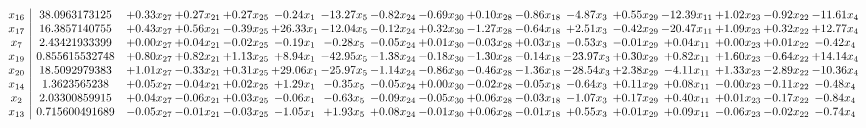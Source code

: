 \documentclass[9pt]{article}
\begin{document}
 \[\begin{array}{c| c c@{\hskip 2pt} c@{\hskip 2pt} c@{\hskip 2pt} c@{\hskip 2pt} c@{\hskip 2pt} c@{\hskip 2pt} c@{\hskip 2pt} c@{\hskip 2pt} c@{\hskip 2pt} c@{\hskip 2pt} c@{\hskip 2pt} c@{\hskip 2pt} c@{\hskip 2pt} c@{\hskip 2pt} c@{\hskip 2pt} }
 x_{16}   &  38.0963173125 & +  0.33 x_{27} & +  0.27 x_{21} & +  0.27 x_{25} & -0.24 x_{1} & -13.27 x_{5} & -0.82 x_{24} & -0.69 x_{30} & +  0.10 x_{28} & -0.86 x_{18} & -4.87 x_{3} & +  0.55 x_{29} & -12.39 x_{11} & +  1.02 x_{23} & -0.92 x_{22} & -11.61 x_{4}\\
 x_{17}   &  16.3857140755 & +  0.43 x_{27} & +  0.56 x_{21} & -0.39 x_{25} & + 26.33 x_{1} & -12.04 x_{5} & -0.12 x_{24} & +  0.32 x_{30} & -1.27 x_{28} & -0.64 x_{18} & +  2.51 x_{3} & -0.42 x_{29} & -20.47 x_{11} & +  1.09 x_{23} & +  0.32 x_{22} & + 12.77 x_{4}\\
 x_{7}   &  2.43421933399 & +  0.00 x_{27} & +  0.04 x_{21} & -0.02 x_{25} & -0.19 x_{1} & -0.28 x_{5} & -0.05 x_{24} & +  0.01 x_{30} & -0.03 x_{28} & +  0.03 x_{18} & -0.53 x_{3} & -0.01 x_{29} & +  0.04 x_{11} & +  0.00 x_{23} & +  0.01 x_{22} & -0.42 x_{4}\\
 x_{19}   &  0.855615532748 & +  0.80 x_{27} & +  0.82 x_{21} & +  1.13 x_{25} & +  8.94 x_{1} & -42.95 x_{5} & -1.38 x_{24} & -0.18 x_{30} & -1.30 x_{28} & -0.14 x_{18} & -23.97 x_{3} & +  0.30 x_{29} & +  0.82 x_{11} & +  1.60 x_{23} & -0.64 x_{22} & + 14.14 x_{4}\\
 x_{20}   &  18.5092979383 & +  1.01 x_{27} & -0.33 x_{21} & +  0.31 x_{25} & + 29.06 x_{1} & -25.97 x_{5} & -1.14 x_{24} & -0.86 x_{30} & -0.46 x_{28} & -1.36 x_{18} & -28.54 x_{3} & +  2.38 x_{29} & -4.11 x_{11} & +  1.33 x_{23} & -2.89 x_{22} & -10.36 x_{4}\\
 x_{14}   &  1.3623565238 & +  0.05 x_{27} & -0.04 x_{21} & +  0.02 x_{25} & +  1.29 x_{1} & -0.35 x_{5} & -0.05 x_{24} & +  0.00 x_{30} & -0.02 x_{28} & -0.05 x_{18} & -0.64 x_{3} & +  0.11 x_{29} & +  0.08 x_{11} & -0.00 x_{23} & -0.11 x_{22} & -0.48 x_{4}\\
 x_{2}   &  2.03300859915 & +  0.04 x_{27} & -0.06 x_{21} & +  0.03 x_{25} & -0.06 x_{1} & -0.63 x_{5} & -0.09 x_{24} & -0.05 x_{30} & +  0.06 x_{28} & -0.03 x_{18} & -1.07 x_{3} & +  0.17 x_{29} & +  0.40 x_{11} & +  0.01 x_{23} & -0.17 x_{22} & -0.84 x_{4}\\
 x_{13}   &  0.715600491689 & -0.05 x_{27} & -0.01 x_{21} & -0.03 x_{25} & -1.05 x_{1} & +  1.93 x_{5} & +  0.08 x_{24} & -0.01 x_{30} & +  0.06 x_{28} & -0.01 x_{18} & +  0.55 x_{3} & +  0.01 x_{29} & +  0.09 x_{11} & -0.06 x_{23} & -0.02 x_{22} & -0.74 x_{4}\\

\end{array}\]
\end{document}
